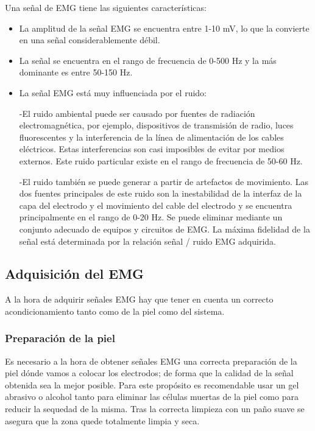 Una señal de EMG tiene las siguientes características:
\begin{itemize}
	\item La amplitud de la señal EMG se encuentra entre 1-10 mV, lo que la convierte en una señal considerablemente débil. 
	\item La señal se encuentra en el rango de frecuencia de 0-500 Hz y la más dominante es entre 50-150 Hz.
	\item La señal EMG está muy influenciada por el ruido:\newline

-El ruido ambiental puede ser causado por fuentes de radiación electromagnética, por ejemplo, dispositivos de transmisión de radio, luces fluorescentes y la interferencia de la línea de alimentación de los cables eléctricos. Estas interferencias son casi imposibles de evitar por medios externos. Este ruido particular existe en el rango de frecuencia de 50-60 Hz. \newline

-El ruido también se puede generar a partir de artefactos de movimiento. Las dos fuentes principales de este ruido son la inestabilidad de la interfaz de la capa del electrodo y el movimiento del cable del electrodo y se encuentra principalmente en el rango de 0-20 Hz. Se puede eliminar mediante un conjunto adecuado de equipos y circuitos de EMG. La máxima fidelidad de la señal está determinada por la relación señal / ruido EMG adquirida. \newline

\end{itemize}
\subsection{Adquisición del EMG }

A la hora de adquirir señales EMG hay que tener en cuenta un correcto acondicionamiento tanto como de la piel como del sistema.

\subsubsection{Preparación de la piel}
 Es necesario a la hora de obtener señales EMG una correcta preparación de la piel dónde vamos a colocar los electrodos; de forma que la calidad de la señal obtenida sea la mejor posible. Para este propósito es recomendable usar un gel abrasivo o alcohol tanto para eliminar las células muertas de la piel como para reducir la sequedad de la misma. Tras la correcta limpieza con un paño suave se asegura que la zona quede totalmente limpia y seca. \newline
